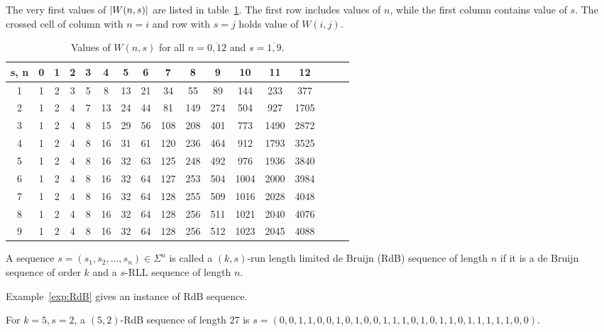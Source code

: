 The very first values of $\left \lvert W(n,s) \right \rvert$ are listed in table~\ref{tab:values_of_W}. The first row includes values of $n$, while the first column contains value of $s$. The crossed cell of column with $n=i$ and row with $s=j$ holds value of $W(i,j)$. 
\begin{table}[htbp]
    \centering
    \caption{Values of $W(n,s)$ for all $n=\overline{0,12}$ and $s=\overline{1,9}$.}
    \begin{tabular}{||c||c|c|c|c|c|c|c|c|c|c|c|c|c|c|c|c|}
    \hline\hline
        s, n & 0 & 1 & 2 & 3 & 4 & 5 & 6 & 7 & 8 & 9 & 10 & 11 & 12\\
        \hline\hline
        1 & 1 & 2 & 3 & 5 & 8 & 13 & 21 & 34 & 55 & 89 & 144 & 233 & 377\\
        2 & 1 & 2 & 4 & 7 & 13 & 24 & 44 & 81 & 149 & 274 & 504 & 927 & 1705\\ 
        3 & 1 & 2 & 4 & 8 & 15 & 29 & 56 & 108 & 208 & 401 & 773 & 1490 & 2872\\
        4 & 1 & 2 & 4 & 8 & 16 & 31 & 61 & 120 & 236 & 464 & 912 & 1793 & 3525\\
        5 & 1 & 2 & 4 & 8 & 16 & 32 & 63 & 125 & 248 & 492 & 976 & 1936 & 3840\\
        6 & 1 & 2 & 4 & 8 & 16 & 32 & 64 & 127 & 253 & 504 & 1004 & 2000 & 3984\\
        7 & 1 & 2 & 4 & 8 & 16 & 32 & 64 & 128 & 255 & 509 & 1016 & 2028 & 4048\\
        8 & 1 & 2 & 4 & 8 & 16 & 32 & 64 & 128 & 256 & 511 & 1021 & 2040 & 4076\\
        9 & 1 & 2 & 4 & 8 & 16 & 32 & 64 & 128 & 256 & 512 & 1023 & 2045 & 4088\\
        \hline
    \end{tabular}
    \label{tab:values_of_W}
\end{table}

\begin{definition}
    A sequence $s=(s_{1},s_{2},\ldots,s_{n})\in\Sigma^{n}$ is called a $(k,s)$-run length limited de Bruijn (\gls{RdB}) sequence of length $n$ if it is a de Bruijn sequence of order $k$ and a $s$-RLL sequence of length $n$.
\end{definition}
Example~\ref{exp:RdB} gives an instance of \gls{RdB} sequence.
\begin{example}\label{exp:RdB}
    For $k=5,s=2$, a $(5,2)$-RdB sequence of length $27$ is $s=(0, 0, 1, 1, 0, 0, 1, 0, 1, 0, 0, 1, 1, 1, 0, 1, 0, 1, 1, 0, 1, 1, 1, 1, 1, 0, 0)$. 
\end{example}

